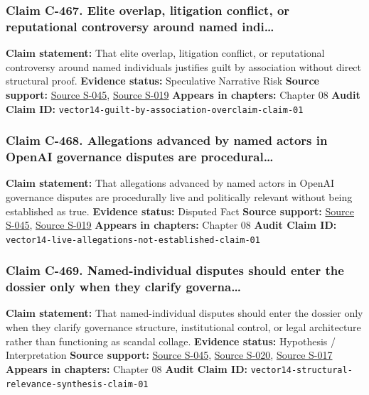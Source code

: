 \documentclass[
  american,
  11pt,
  letterpaper,
]{article}
\begin{document}
\subsubsection{Claim C-467. Elite overlap, litigation conflict, or
reputational controversy around named
indi\ldots{}}\label{claim-c-467-elite-overlap-litigation-conflict-or-reputational-controversy-around-named-indi}

\textbf{Claim statement:} That elite overlap, litigation conflict, or
reputational controversy around named individuals justifies guilt by
association without direct structural proof. \textbf{Evidence status:}
Speculative Narrative Risk \textbf{Source support:}
\hyperref[source-s-045-musk-v-altman-4-24-cv-04722]{Source S-045},
\hyperref[source-s-019-how-elon-musk-97-4-billion-bid-complicates-matters-for-openai]{Source
S-019} \textbf{Appears in chapters:} Chapter 08 \textbf{Audit Claim ID:}
\texttt{vector14-guilt-by-association-overclaim-claim-01}

\subsubsection{Claim C-468. Allegations advanced by named actors in
OpenAI governance disputes are
procedural\ldots{}}\label{claim-c-468-allegations-advanced-by-named-actors-in-openai-governance-disputes-are-procedural}

\textbf{Claim statement:} That allegations advanced by named actors in
OpenAI governance disputes are procedurally live and politically
relevant without being established as true. \textbf{Evidence status:}
Disputed Fact \textbf{Source support:}
\hyperref[source-s-045-musk-v-altman-4-24-cv-04722]{Source S-045},
\hyperref[source-s-019-how-elon-musk-97-4-billion-bid-complicates-matters-for-openai]{Source
S-019} \textbf{Appears in chapters:} Chapter 08 \textbf{Audit Claim ID:}
\texttt{vector14-live-allegations-not-established-claim-01}

\subsubsection{Claim C-469. Named-individual disputes should enter the
dossier only when they clarify
governa\ldots{}}\label{claim-c-469-named-individual-disputes-should-enter-the-dossier-only-when-they-clarify-governa}

\textbf{Claim statement:} That named-individual disputes should enter
the dossier only when they clarify governance structure, institutional
control, or legal architecture rather than functioning as scandal
collage. \textbf{Evidence status:} Hypothesis / Interpretation
\textbf{Source support:}
\hyperref[source-s-045-musk-v-altman-4-24-cv-04722]{Source S-045},
\hyperref[source-s-020-openai-says-musk-agreed-the-chatgpt-maker-should-become-a-for-profit-company]{Source
S-020},
\hyperref[source-s-017-openai-board-unanimously-rejects-elon-musk-s-97-4-billion-proposal]{Source
S-017} \textbf{Appears in chapters:} Chapter 08 \textbf{Audit Claim ID:}
\texttt{vector14-structural-relevance-synthesis-claim-01}
\end{document}
